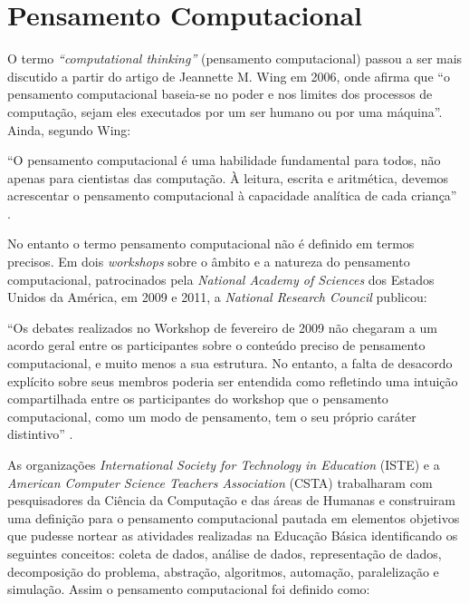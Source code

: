 \documentclass[12pt, openright, a4paper, brazil, english, french, spanish, bibjustif, openany, oneside]{abntex2}
\begin{document}
\section{Pensamento Computacional}

O termo \textit{``computational thinking''} (pensamento computacional) passou a ser mais discutido a partir do artigo de Jeannette M. Wing em 2006, onde afirma que ``o pensamento computacional baseia-se no poder e nos limites dos processos de computação, sejam eles executados por um ser humano ou por uma máquina''\cite{wing}. Ainda, segundo Wing:

\begin{citacao}

``O pensamento computacional é uma habilidade fundamental para todos, não apenas para cientistas das computação. À leitura, escrita e aritmética, devemos acrescentar o pensamento computacional à capacidade analítica de cada criança'' \cite{wing}.

\end{citacao}




No entanto o termo pensamento computacional não é definido em termos precisos. Em dois \textit{workshops} sobre o âmbito e a natureza do pensamento computacional, patrocinados pela \textit{National Academy of Sciences} dos Estados Unidos da América, em 2009 e 2011, a \textit{National Research Council} publicou:

\begin{citacao}

``Os debates realizados no Workshop de fevereiro de 2009 não chegaram a um acordo geral entre os participantes sobre o conteúdo preciso de pensamento computacional, e muito menos a sua estrutura. No entanto, a falta de desacordo explícito sobre seus membros poderia ser entendida como refletindo uma intuição compartilhada entre os participantes do workshop que o pensamento computacional, como um modo de pensamento, tem o seu próprio caráter distintivo'' \cite{NRC}.

\end{citacao}

As organizações \textit{International Society for Technology in Education} (ISTE) e a \textit{American Computer Science Teachers Association} (CSTA) trabalharam com pesquisadores da Ciência da Computação e das áreas de Humanas e construiram uma definição para o pensamento computacional pautada em elementos objetivos que pudesse nortear as atividades realizadas na Educação Básica identificando os seguintes conceitos: coleta de dados, análise de dados, representação de dados, decomposição do problema, abstração, algoritmos, automação, paralelização e simulação. Assim o pensamento computacional foi definido como:
\end{document}
